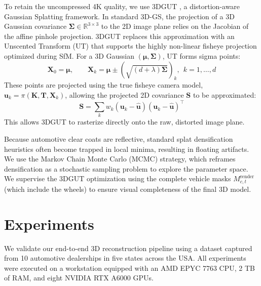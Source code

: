 \documentclass[letterpaper, 10 pt, conference]{ieeeconf}  %
\begin{document}
To retain the uncompressed 4K quality, we use 3DGUT \cite{wu20253dgut}, a distortion-aware Gaussian Splatting framework. In standard 3D-GS, the projection of a 3D Gaussian covariance $\bm{\Sigma} \in \mathbb{R}^{3 \times 3}$ to the 2D image plane relies on the Jacobian of the affine pinhole projection. 3DGUT replaces this approximation with an Unscented Transform (UT) that supports the highly non-linear fisheye projection optimized during SfM. For a 3D Gaussian $(\boldsymbol{\mu},\boldsymbol{\Sigma})$, UT forms sigma points:
\begin{equation}
    \mathbf{X}_0=\boldsymbol{\mu}, \qquad \mathbf{X}_{k}=\boldsymbol{\mu}\pm \left(\sqrt{(d+\lambda)\boldsymbol{\Sigma}}\right)_k,\ \ k=1,\dots,d
\end{equation}
These points are projected using the true fisheye camera model, $\mathbf{u}_k=\pi(\mathbf{K},\mathbf{T},\mathbf{X}_k)$, allowing the projected 2D covariance $\mathbf{S}$ to be approximated:
\begin{equation}
    \mathbf{S}=\sum_{k} w_k(\mathbf{u}_k-\hat{\mathbf{u}})(\mathbf{u}_k-\hat{\mathbf{u}})^{\top}
\end{equation}
This allows 3DGUT to rasterize directly onto the raw, distorted image plane.



Because automotive clear coats are reflective, standard splat densification heuristics often become trapped in local minima, resulting in floating artifacts. We use the Markov Chain Monte Carlo (MCMC) strategy, which reframes densification as a stochastic sampling problem to explore the parameter space. We supervise the 3DGUT optimization using the complete vehicle masks $M^{\text{render}}_{c,t}$ (which include the wheels) to ensure visual completeness of the final 3D model.
















\section{Experiments} 
We validate our end-to-end 3D reconstruction pipeline using a dataset captured from 10 automotive dealerships in five states across the USA. All experiments were executed on a workstation equipped with an AMD EPYC 7763 CPU, 2 TB of RAM, and eight NVIDIA RTX A6000 GPUs. 
\end{document}
